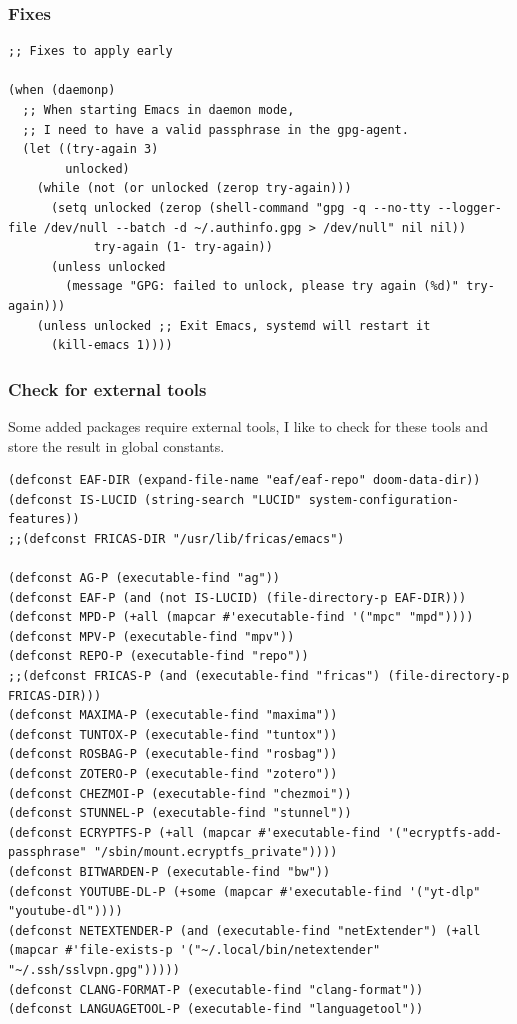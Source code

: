 \documentclass[11pt]{article}
\begin{document}
\subsubsection{Fixes}
\label{sec:org7f7ad39}

\begin{verbatim}
;; Fixes to apply early

(when (daemonp)
  ;; When starting Emacs in daemon mode,
  ;; I need to have a valid passphrase in the gpg-agent.
  (let ((try-again 3)
        unlocked)
    (while (not (or unlocked (zerop try-again)))
      (setq unlocked (zerop (shell-command "gpg -q --no-tty --logger-file /dev/null --batch -d ~/.authinfo.gpg > /dev/null" nil nil))
            try-again (1- try-again))
      (unless unlocked
        (message "GPG: failed to unlock, please try again (%d)" try-again)))
    (unless unlocked ;; Exit Emacs, systemd will restart it
      (kill-emacs 1))))
\end{verbatim}

\subsubsection{Check for external tools}
\label{sec:orgbda306f}
Some added packages require external tools, I like to check for these tools and
store the result in global constants.

\begin{verbatim}
(defconst EAF-DIR (expand-file-name "eaf/eaf-repo" doom-data-dir))
(defconst IS-LUCID (string-search "LUCID" system-configuration-features))
;;(defconst FRICAS-DIR "/usr/lib/fricas/emacs")

(defconst AG-P (executable-find "ag"))
(defconst EAF-P (and (not IS-LUCID) (file-directory-p EAF-DIR)))
(defconst MPD-P (+all (mapcar #'executable-find '("mpc" "mpd"))))
(defconst MPV-P (executable-find "mpv"))
(defconst REPO-P (executable-find "repo"))
;;(defconst FRICAS-P (and (executable-find "fricas") (file-directory-p FRICAS-DIR)))
(defconst MAXIMA-P (executable-find "maxima"))
(defconst TUNTOX-P (executable-find "tuntox"))
(defconst ROSBAG-P (executable-find "rosbag"))
(defconst ZOTERO-P (executable-find "zotero"))
(defconst CHEZMOI-P (executable-find "chezmoi"))
(defconst STUNNEL-P (executable-find "stunnel"))
(defconst ECRYPTFS-P (+all (mapcar #'executable-find '("ecryptfs-add-passphrase" "/sbin/mount.ecryptfs_private"))))
(defconst BITWARDEN-P (executable-find "bw"))
(defconst YOUTUBE-DL-P (+some (mapcar #'executable-find '("yt-dlp" "youtube-dl"))))
(defconst NETEXTENDER-P (and (executable-find "netExtender") (+all (mapcar #'file-exists-p '("~/.local/bin/netextender" "~/.ssh/sslvpn.gpg")))))
(defconst CLANG-FORMAT-P (executable-find "clang-format"))
(defconst LANGUAGETOOL-P (executable-find "languagetool"))
\end{verbatim}
\end{document}
